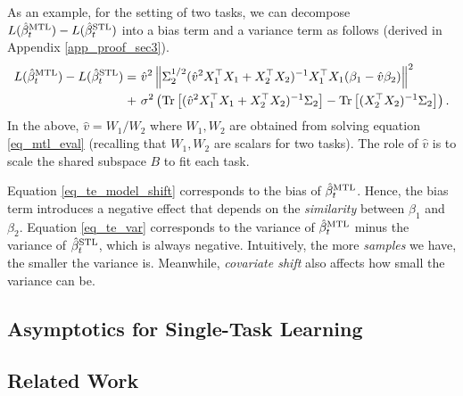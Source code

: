 As an example, for the setting of two tasks, we can decompose $L(\hat{\beta}_t^{\text{MTL}}) - L(\hat{\beta}_t^{\text{STL}})$ into a bias term and a variance term as follows (derived in Appendix \ref{app_proof_sec3}).
{\small\begin{align}
	L(\hat{\beta}_t^{\text{MTL}}) - L(\hat{\beta}_t^{\text{STL}}) =& ~ \hat{v}^2 \left\| \Sigma_2^{1/2} (\hat{v}^2 X_1^{\top}X_1 + X_2^{\top}X_2)^{-1}X_1^{\top}X_1 (\beta_1 - \hat{v}\beta_2) \right\|^2 \label{eq_te_model_shift} \\
	+&~ \sigma^2 \left({\operatorname{Tr}\left[(\hat{v}^2 X_1^{\top}X_1 + X_2^{\top}X_2)^{-1}\Sigma_2\right] - \operatorname{Tr}\left[(X_2^{\top}X_2)^{-1}\Sigma_2\right]}\right). \label{eq_te_var}
\end{align}}%
In the above, $\hat{v} = W_1 / W_2$ where $W_1, W_2$ are obtained from solving equation \eqref{eq_mtl_eval} (recalling that $W_1, W_2$ are scalars for two tasks).
The role of $\hat{v}$ is to scale the shared subspace $B$ to fit each task.

Equation \eqref{eq_te_model_shift} corresponds to the bias of $\hat{\beta}_t^{\text{MTL}}$.
Hence, the bias term introduces a negative effect that depends on the \textit{similarity} between $\beta_1$ and $\beta_2$.
Equation \eqref{eq_te_var} corresponds to the variance of $\hat{\beta}_t^{\text{MTL}}$ minus the variance of $\hat{\beta}_t^{\text{STL}}$, which is always negative.
Intuitively, the more \textit{samples} we have, the smaller the variance is.
Meanwhile, \textit{covariate shift} also affects how small the variance can be.

\subsection{Asymptotics for Single-Task Learning}

\subsection{Related Work}

